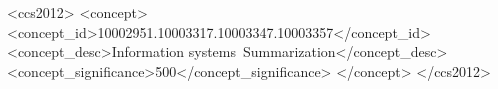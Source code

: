 \documentclass[sigconf]{acmart}
\begin{document}
\begin{CCSXML}
	<ccs2012>
	<concept>
	<concept_id>10002951.10003317.10003347.10003357</concept_id>
	<concept_desc>Information systems~Summarization</concept_desc>
	<concept_significance>500</concept_significance>
	</concept>
	</ccs2012>
\end{CCSXML}

%
\maketitle

%


%







\end{document}

